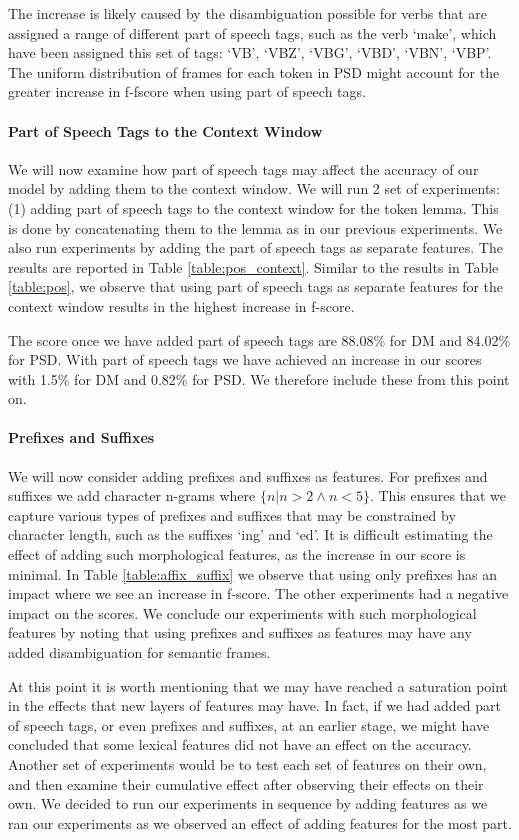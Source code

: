 The increase is likely caused by the disambiguation possible for verbs that are assigned a range of different part of speech tags, such as the verb `make', which have been assigned this set of tags: `VB', `VBZ', `VBG', `VBD', `VBN', `VBP'. The uniform distribution of frames for each token in PSD might account for the greater increase in f-fscore when using part of speech tags.

\paragraph{Part of Speech Tags to the Context Window} We will now examine how part of speech tags may affect the accuracy of our model by adding them to the context window. We will run 2 set of experiments: (1) adding part of speech tags to the context window for the token lemma. This is done by concatenating them to the lemma as in our previous experiments. We also run experiments by adding the part of speech tags as separate features. The results are reported in Table \ref{table:pos_context}. Similar to the results in Table \ref{table:pos}, we observe that using part of speech tags as separate features for the context window results in the highest increase in f-score. 

The score once we have added part of speech tags are 88.08\% for DM and 84.02\% for PSD. With part of speech tags we have achieved an increase in our scores with 1.5\% for DM and 0.82\% for PSD. We therefore include these from this point on.

\paragraph{Prefixes and Suffixes} We will now consider adding prefixes and suffixes as features. For prefixes and suffixes we add character n-grams where ${\{n|n>2 \wedge n<5\}}$. This ensures that we capture various types of prefixes and suffixes that may be constrained by character length, such as the suffixes `ing' and `ed'. It is difficult estimating the effect of adding such morphological features, as the increase in our score is minimal. In Table \ref{table:affix_suffix} we observe that using only prefixes has an impact where we see an increase in f-score. The other experiments had a negative impact on the scores. We conclude our experiments with such morphological features by noting that using prefixes and suffixes as features may have any added disambiguation for semantic frames.

At this point it is worth mentioning that we may have reached a saturation point in the effects that new layers of features may have. In fact, if we had added part of speech tags, or even prefixes and suffixes, at an earlier stage, we might have concluded that some lexical features did not have an effect on the accuracy. Another set of experiments would be to test each set of features on their own, and then examine their cumulative effect after observing their effects on their own. We decided to run our experiments in sequence by adding features as we ran our experiments as we observed an effect of adding features for the most part.



